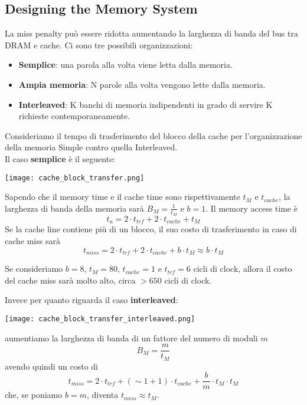 \subsection{Designing the Memory System}
La miss penalty può essere ridotta aumentando la larghezza di banda del bus tra DRAM e cache. Ci sono tre possibili organizzazioni:
\begin{itemize}
	\item \textbf{Semplice}: una parola alla volta viene letta dalla memoria.
	\item \textbf{Ampia memoria}: N parole alla volta vengono lette dalla memoria.
	\item \textbf{Interleaved}: K banchi di memoria indipendenti in grado di servire K richieste contemporaneamente.
\end{itemize}
Consideriamo il tempo di trasferimento del blocco della cache per l'organizzazione della memoria Simple contro quella Interleaved.\\
Il caso \textbf{semplice} è il seguente:
\begin{center}
	\texttt{[image: cache\_block\_transfer.png]}
\end{center}
Sapendo che il memory time e il cache time sono rispettivamente $t_M$ e $t_{cache}$, la larghezza di banda della memoria sarà $B_M = \frac{1}{t_M}$ e $b=1$. Il memory access time è
\begin{equation*}
	t_a=2 \cdot t_{trf} + 2 \cdot t_{cache} + t_M
\end{equation*}
Se la cache line contiene più di un blocco, il suo costo di trasferimento in caso di cache miss sarà
\begin{equation*}
	t_{miss}=2 \cdot t_{trf} + 2 \cdot t_{cache} + b \cdot t_M \approx b \cdot t_M
\end{equation*}

\begin{example}
	Se consideriamo $b=8$, $t_M =80$, $t_{cache}=1$ e $t_{trf}=6$ cicli di clock, allora il costo del cache miss sarà molto alto, circa $>650$ cicli di clock.
\end{example}
Invece per quanto riguarda il caso \textbf{interleaved}:
\begin{center}
	\texttt{[image: cache\_block\_transfer\_interleaved.png]}
\end{center}
aumentiamo la larghezza di banda di un fattore del numero di moduli $m$
\begin{equation*}
	B_M = \frac{m}{t_M}
\end{equation*}
avendo quindi un costo di
\begin{equation*}
	t_{miss}=2 \cdot t_{trf} + (\sim 1 + 1) \cdot t_{cache} + \frac{b}{m} \cdot t_M \cdot t_M
\end{equation*}
che, se poniamo $b=m$, diventa $t_{miss} \approx t_M$.

